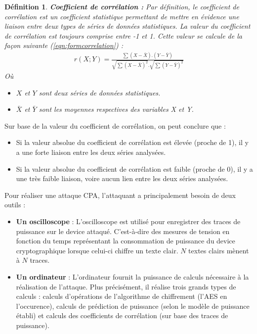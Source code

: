 \documentclass[oneside]{book}
\newtheorem{definition}{Définition}[section]
\begin{document}
\theoremstyle{definition}
\begin{definition}{\textbf{Coefficient de corrélation :}}
Par définition, le coefficient de corrélation est un coefficient statistique permettant de mettre en évidence une liaison entre deux types de séries de données statistiques. La valeur du coefficient de corrélation est toujours comprise entre -1 et 1. Cette valeur se calcule de la façon suivante (\ref{eqn:formcorrelation}) :
\begin{gather}
	r(X;Y) = \frac{\sum(X-\bar{X}).(Y-\bar{Y}) }{\sqrt{\sum(X-\bar{X})^2}.\sqrt{\sum(Y-\bar{Y})^2}}\label{eqn:formcorrelation}
\end{gather}
Où 
\begin{itemize}
\item $X$ et $Y$ sont deux séries de données statistiques.
\item $\bar{X}$ et $\bar{Y}$ sont les moyennes respectives des variables X et Y.\vspace{0.4 cm}
\end{itemize}
\end{definition}

\vspace{-0.4cm}\hspace{-0.5 cm}Sur base de la valeur du coefficient de corrélation, on peut conclure que :
\begin{itemize}
\item Si la valeur absolue du coefficient de corrélation est élevée (proche de 1), il y a une forte liaison entre les deux séries analysées.
\item Si la valeur absolue du coefficient de corrélation est faible (proche de 0), il y a une très faible liaison, voire aucun lien entre les deux séries analysées.
\end{itemize}

\hspace{-0.5 cm}Pour réaliser une attaque CPA, l'attaquant a principalement besoin de deux outils :
\begin{itemize}
\item \textbf{Un oscilloscope} : L'oscilloscope est utilisé pour enregistrer des traces de puissance sur le device attaqué. C'est-à-dire des mesures de tension en fonction du temps représentant la consommation de puissance du device cryptographique lorsque celui-ci chiffre un texte clair. $N$ textes clairs mènent à $N$ traces.
\item \textbf{Un ordinateur} : L'ordinateur fournit la puissance de calculs nécessaire à la réalisation de l'attaque. Plus précisément, il réalise trois grands types de calculs : calculs d'opérations de l'algorithme de chiffrement (l'AES en l'occurence), calculs de prédiction de puissance (selon le modèle de puissance établi) et calculs des coefficients de corrélation (sur base des traces de puissance). \\
\end{itemize}
\end{document}
